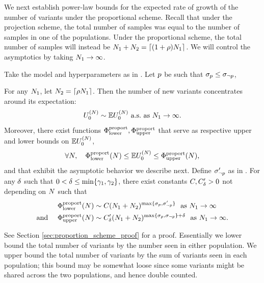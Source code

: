 We next establish power-law bounds for the expected rate of growth of the number of variants under the proportional scheme. Recall that under the projection scheme, the total number of samples was equal to the number of samples in one of the populations. Under the proportional scheme, the total number of samples will instead be $N_{1} + N_{2} = \lceil (1+\rho) N_{1} \rceil$. We will control the asymptotics by taking $N_{1} \rightarrow \infty$.
\begin{myProposition} 
    \label{coro:proportional}
	Take the model and hyperparameters as in . Let $p$ be such that $\sigma_{p} \le \sigma_{\neg p}$, 
	
	For any $N_{1}$, let $N_{2} = \lceil\rho N_{1}\rceil$.
	Then the number of new variants concentrates around its expectation: 
	\[
		\news{\zerovec}{\vecsamplesize} \sim \E \news{\zerovec}{\vecsamplesize}\textrm{ a.s.\ as } \samplesize{1} \to \infty.
	\]
	 Moreover,
	there exist functions $\Phi_{\mathrm{lower}}^{\mathrm{proport}}, \Phi_{\mathrm{upper}}^{\mathrm{proport}}$ that serve as respective upper and lower bounds on $\E \news{\zerovec}{\vecsamplesize}$,
    \begin{equation*}
        \forall \vecsamplesize,\quad \lowerboundproport(\vecsamplesize)
        		\le \E \news{\zerovec}{\vecsamplesize}
		\le \upperboundproport(\vecsamplesize),
    \end{equation*}
	and that exhibit the asymptotic behavior we describe next. 
	Define $\sigma_{\neg p}'$ as in .
	For any $\delta$ such that $0<\delta\le \min\{\gamma_{1},\gamma_{2}\}$, there exist constants $C,C'_{\delta} > 0$ not depending on $\vecsamplesize$ such that 
    \begin{align*}
	\lowerboundproport(\vecsamplesize)
		&\sim C(\samplesize{1}+\samplesize{2})^{\max\{\rate{\popidx},\rate{\notpopidx}'\}}
			\textrm{ \ as } \samplesize{1} \rightarrow \infty \\
    	\textrm{and } \quad \upperboundproport(\vecsamplesize)
		&\sim C'_{\smallpositive}(\samplesize{1}+\samplesize{2})^{\max\{\rate{\popidx},\rate{\notpopidx}\}+\smallpositive} 
			\textrm{ \ as } \samplesize{1} \rightarrow \infty.
    \end{align*}
\end{myProposition}
See Section \cref{sec:proportion_scheme_proof} for a proof. Essentially we lower bound the total number of variants by the number seen in either population. 
We upper bound the total number of variants by the sum of variants seen in each population; this bound may be somewhat loose since some variants might be shared across the two populations, and hence double counted.  

